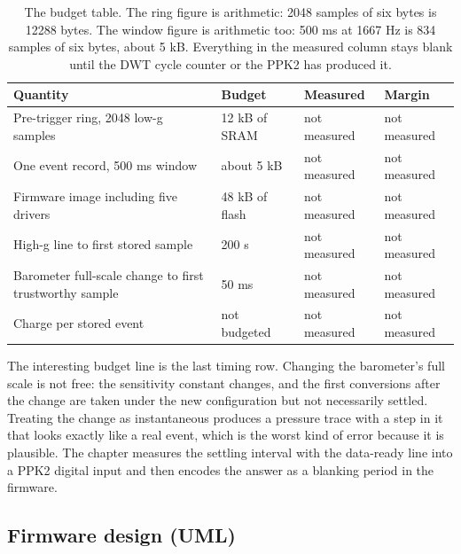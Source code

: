 
\begin{table}[H]\centering\small
\begin{tabular}{p{44mm}p{28mm}p{28mm}p{30mm}}
\toprule
Quantity & Budget & Measured & Margin \\
\midrule
Pre-trigger ring, 2048 low-g samples & 12 kB of SRAM & not measured & not measured \\
One event record, 500 ms window & about 5 kB & not measured & not measured \\
Firmware image including five drivers & 48 kB of flash & not measured & not measured \\
High-g line to first stored sample & 200 \textmu{}s & not measured & not measured \\
Barometer full-scale change to first trustworthy sample & 50 ms & not measured & not measured \\
Charge per stored event & not budgeted & not measured & not measured \\
\bottomrule
\end{tabular}
\caption{The budget table. The ring figure is arithmetic: 2048 samples of six bytes is 12288 bytes. The window figure is arithmetic too: 500 ms at 1667 Hz is 834 samples of six bytes, about 5 kB. Everything in the measured column stays blank until the DWT cycle counter or the PPK2 has produced it.}
\end{table}

The interesting budget line is the last timing row. Changing the barometer's
full scale is not free: the sensitivity constant changes, and the first
conversions after the change are taken under the new configuration but not
necessarily settled. Treating the change as instantaneous produces a pressure
trace with a step in it that looks exactly like a real event, which is the worst
kind of error because it is plausible. The chapter measures the settling
interval with the data-ready line into a PPK2 digital input and then encodes the
answer as a blanking period in the firmware.

\subsection*{Firmware design (UML)}

